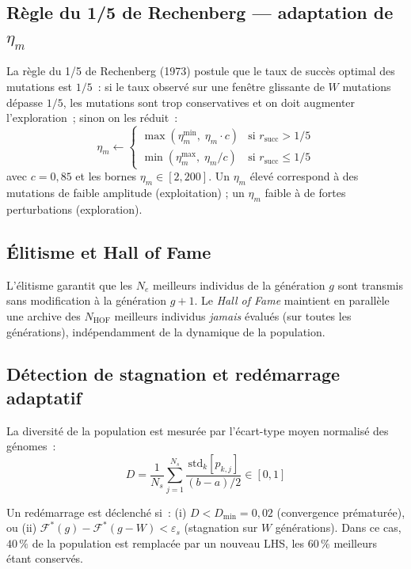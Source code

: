 \documentclass[12pt,a4paper]{article}
\newcommand{\eps}{\varepsilon}
\numberwithin{equation}{section}
\numberwithin{figure}{section}
\numberwithin{table}{section}
\begin{document}
\subsection{Règle du 1/5 de Rechenberg --- adaptation de $\eta_m$}

La règle du 1/5 de Rechenberg (1973) postule que le taux de succès optimal
des mutations est $1/5$~: si le taux observé sur une fenêtre glissante de $W$
mutations dépasse $1/5$, les mutations sont trop conservatives et on doit
augmenter l'exploration~; sinon on les réduit~:
\begin{equation}
    \eta_m \leftarrow \begin{cases}
        \max(\eta_m^{\min},\; \eta_m \cdot c) & \text{si } r_{\text{succ}} > 1/5 \\
        \min(\eta_m^{\max},\; \eta_m / c) & \text{si } r_{\text{succ}} \leq 1/5
    \end{cases}
    \label{eq:rechenberg}
\end{equation}
avec $c = 0{,}85$ et les bornes $\eta_m \in [2, 200]$.
Un $\eta_m$ élevé correspond à des mutations de faible amplitude (exploitation) ;
un $\eta_m$ faible à de fortes perturbations (exploration).

\subsection{Élitisme et Hall of Fame}

L'élitisme garantit que les $N_e$ meilleurs individus de la génération $g$
sont transmis sans modification à la génération $g+1$. Le \emph{Hall of Fame}
maintient en parallèle une archive des $N_{\text{HOF}}$ meilleurs individus
\emph{jamais} évalués (sur toutes les générations), indépendamment de la
dynamique de la population.

\subsection{Détection de stagnation et redémarrage adaptatif}

La diversité de la population est mesurée par l'écart-type moyen normalisé
des génomes~:
\begin{equation}
    D = \frac{1}{N_s} \sum_{j=1}^{N_s}
    \frac{\text{std}_{k}\!\left[p_{k,j}\right]}{(b-a)/2}
    \in [0,1]
    \label{eq:diversity}
\end{equation}

Un redémarrage est déclenché si~: (i) $D < D_{\min} = 0{,}02$ (convergence prématurée),
ou (ii) $\mathcal{F}^* (g) - \mathcal{F}^*(g-W) < \eps_s$ (stagnation sur $W$
générations). Dans ce cas, $40\,\%$ de la population est remplacée par un
nouveau LHS, les $60\,\%$ meilleurs étant conservés.
\end{document}
